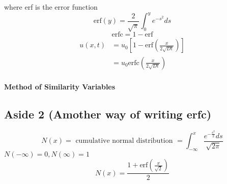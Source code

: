 \documentclass[
	date={September 4{,} 2024}
]{math486notes}
\begin{document}
where erf is the error function
\begin{equation}
	\mbox{erf}(y) = \frac{2}{\sqrt{\pi}}\int_{0}^{y} e^{-s^{2}}ds
	\label{eq:erf}
\end{equation}
\[ \mbox{erfc} = 1 - \mbox{erf} \]
\begin{equation*}
\begin{aligned}
	u(x, t) &= u_{0}\left[ 1 - \mbox{erf}\left( \frac{x}{2\sqrt{Dt}} \right) \right]\\
			&= u_{0}\mbox{erfc}\left( \frac{x}{2\sqrt{Dt}} \right)\\
\end{aligned}
\end{equation*}

\begin{center}
	\textbf{Method of Similarity Variables}
\end{center}

\subsection{Aside 2 (Amother way of writing \mbox{erfc})}\label{subsec:aside-2}
\begin{equation}
	N(x) = \mbox{ cumulative normal distribution } = \int_{-\infty}^{x}\frac{e^{-\frac{s^{2}}{2}}ds}{\sqrt{2\pi}}
	\label{eq:cumulative-normal-distribution}
\end{equation}
$N(-\infty) = 0, N(\infty) = 1$
\[ N(x) = \frac{1 + \mbox{erf}\left( \frac{x}{\sqrt{2}} \right)}{2} \]
\end{document}
